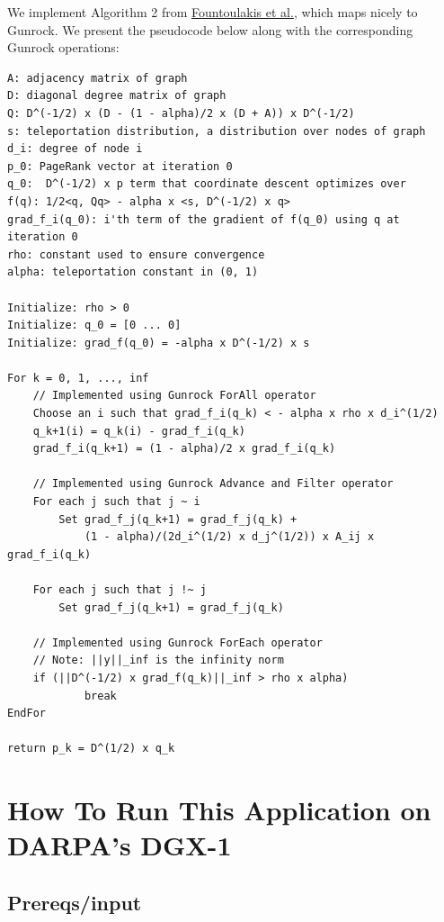 \documentclass[10pt,oneside]{memoir}
\begin{document}
We implement Algorithm 2 from
\href{https://arxiv.org/pdf/1602.01886.pdf}{Fountoulakis et al.}, which
maps nicely to Gunrock. We present the pseudocode below along with the
corresponding Gunrock operations:

\begin{verbatim}
A: adjacency matrix of graph
D: diagonal degree matrix of graph
Q: D^(-1/2) x (D - (1 - alpha)/2 x (D + A)) x D^(-1/2)
s: teleportation distribution, a distribution over nodes of graph
d_i: degree of node i
p_0: PageRank vector at iteration 0
q_0:  D^(-1/2) x p term that coordinate descent optimizes over
f(q): 1/2<q, Qq> - alpha x <s, D^(-1/2) x q>
grad_f_i(q_0): i'th term of the gradient of f(q_0) using q at iteration 0
rho: constant used to ensure convergence
alpha: teleportation constant in (0, 1)

Initialize: rho > 0
Initialize: q_0 = [0 ... 0]
Initialize: grad_f(q_0) = -alpha x D^(-1/2) x s

For k = 0, 1, ..., inf
    // Implemented using Gunrock ForAll operator
    Choose an i such that grad_f_i(q_k) < - alpha x rho x d_i^(1/2)
    q_k+1(i) = q_k(i) - grad_f_i(q_k)
    grad_f_i(q_k+1) = (1 - alpha)/2 x grad_f_i(q_k)

    // Implemented using Gunrock Advance and Filter operator
    For each j such that j ~ i
        Set grad_f_j(q_k+1) = grad_f_j(q_k) +
            (1 - alpha)/(2d_i^(1/2) x d_j^(1/2)) x A_ij x grad_f_i(q_k)

    For each j such that j !~ j
        Set grad_f_j(q_k+1) = grad_f_j(q_k)

    // Implemented using Gunrock ForEach operator
    // Note: ||y||_inf is the infinity norm
    if (||D^(-1/2) x grad_f(q_k)||_inf > rho x alpha)
            break
EndFor

return p_k = D^(1/2) x q_k
\end{verbatim}

\hypertarget{how-to-run-this-application-on-darpas-dgx-1-5}{%
\section{How To Run This Application on DARPA's
DGX-1}\label{how-to-run-this-application-on-darpas-dgx-1-5}}

\hypertarget{prereqsinput-4}{%
\subsection{Prereqs/input}\label{prereqsinput-4}}
\end{document}
